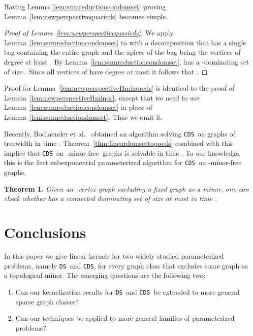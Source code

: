 \documentclass[11pt]{article}
\newtheorem{theorem}{Theorem}
\newcommand{\Hmf}{-minor-free}
\newcommand{\tDS}{{\texttt{\sc DS}}}
\newcommand{\tCDS}{{\texttt{\sc CDS}}}
\begin{document}
Having Lemma \ref{lem:sumreductioncondomset} proving Lemma~\ref{lem:newperspectivequasicds} becomes simple.

\begin{proof}[Proof of Lemma~\ref{lem:newperspectivequasicds}]
We apply Lemma~\ref{lem:sumreductioncondomset} to  with a decomposition that has a single bag containing the entire graph and the apices  of the bag being the vertices of degree at least . By Lemma~\ref{lem:sumreductioncondomset},  has a -dominating set of size . Since all vertices of  have degree at most  it follows that .  
\end{proof}
 



Proof for Lemma~\ref{lem:newperspectiveHminorcds} is identical to the proof of Lemma~\ref{lem:newperspectiveHminor}, except that we need to use Lemma~\ref{lem:sumreductioncondomset} in  
place of Lemma~\ref{lem:sumreductiondomset}. Thus we omit it. 
 



Recently, Bodlaender et al.~\cite{BodlaenderCKN13} obtained an algorithm solving \tCDS \ on graphs of treewidth  in time . Theorem~\ref{thm:lineardomsettopocds} combined with this implies that  \tCDS \,  on \Hmf \, graphs is solvable in time . To our knowledge, this is the first subexponential parameterized algorithm for \tCDS \, on \Hmf \, graphs.




\begin{theorem}
\label{thm:subexpcondomset}
Given an -vertex  graph  excluding a fixed graph  as a minor,  one  can check whether  has a connected dominating set of size at most  in time 
. 
\end{theorem}






\section{Conclusions}\label{sec:concludes}
In this paper we give linear kernels for two widely studied parameterized problems, namely \tDS\ and  \tCDS,
for every graph class that excludes some graph as a topological minor. The emerging questions are the following two:



\begin{enumerate}
\item Can our kernelization results for  \tDS\ and  \tCDS\  be extended to more general sparse graph classes?
\item Can our techniques be applied to more general families of parameterized problems?
\end{enumerate}
\end{document}
